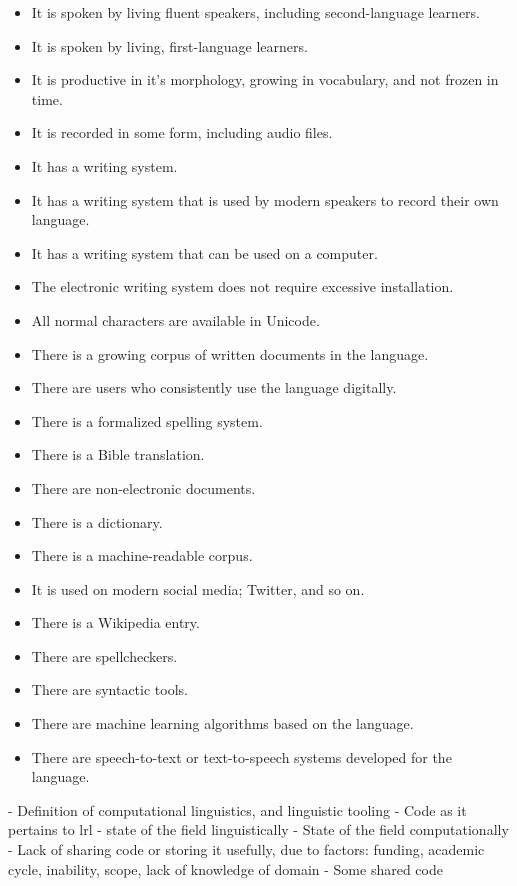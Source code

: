 \documentclass[10pt, a4paper]{article}
\begin{document}
\begin{itemize}
\item It is spoken by living fluent speakers, including second-language learners.
\item It is spoken by living, first-language learners.
\item It is productive in it's morphology, growing in vocabulary, and not frozen in time.
\item It is recorded in some form, including audio files.
\item It has a writing system.
\item It has a writing system that is used by modern speakers to record their own language.
\item It has a writing system that can be used on a computer.
\item The electronic writing system does not require excessive installation.
\item All normal characters are available in Unicode.
\item There is a growing corpus of written documents in the language.
\item There are users who consistently use the language digitally.
\item There is a formalized spelling system.
\item There is a Bible translation. %
\item There are non-electronic documents.
\item There is a dictionary.
\item There is a machine-readable corpus.
\item It is used on modern social media; Twitter, and so on.
\item There is a Wikipedia entry.
\item There are spellcheckers.
\item There are syntactic tools.
\item There are machine learning algorithms based on the language.
\item There are speech-to-text or text-to-speech systems developed for the language.
\end{itemize}


- Definition of computational linguistics, and linguistic tooling
- Code as it pertains to lrl
- state of the field linguistically
- State of the field computationally
- Lack of sharing code or storing it usefully, due to factors: funding, academic cycle, inability, scope, lack of knowledge of domain
- Some shared code
\end{document}
